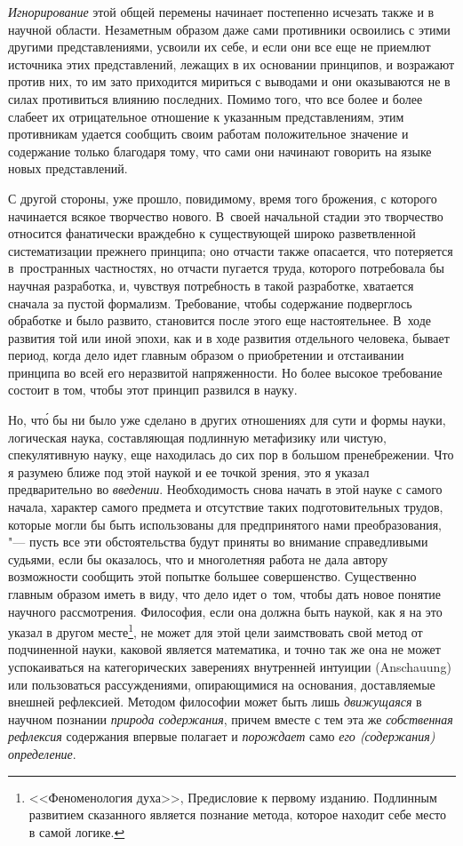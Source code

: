 {\em Игнорирование} этой общей перемены начинает постепенно исчезать также и в
научной области. Незаметным образом даже сами противники освоились с этими
другими представлениями, усвоили их себе, и если они все еще не приемлют
источника этих представлений, лежащих в их основании принципов, и возражают
против них, то им зато приходится мириться с выводами и они оказываются не в
силах противиться влиянию последних. Помимо того, что все более и более слабеет
их отрицательное отношение к указанным представлениям, этим противникам удается
сообщить своим работам положительное значение и содержание только благодаря
тому, что сами они начинают говорить на языке новых представлений.

С другой стороны, уже прошло, повидимому, время того брожения, с которого
начинается всякое творчество нового. В~своей начальной стадии это творчество
относится фанатически враждебно к существующей широко разветвленной
систематизации прежнего принципа; оно отчасти также опасается, что потеряется
в~пространных частностях, но отчасти пугается труда, которого потребовала бы
научная разработка, и, чувствуя потребность в такой разработке, хватается
сначала за пустой формализм. Требование, чтобы содержание подверглось обработке
и было развито, становится после этого еще настоятельнее. В~ходе развития той
или иной эпохи, как и в ходе развития отдельного человека, бывает период, когда
дело идет главным образом о приобретении и отстаивании принципа во всей его
неразвитой напряженности. Но более высокое требование состоит в том, чтобы этот
принцип развился в науку.

Но, чт\'{о} бы ни было уже сделано в других отношениях для сути и формы науки,
логическая наука, составляющая подлинную метафизику или чистую, спекулятивную
науку, еще находилась до сих пор в большом пренебрежении. Что я разумею ближе
под этой наукой и ее точкой зрения, это я указал предварительно во
{\em введении}. Необходимость снова начать в этой науке с самого начала,
характер самого предмета и отсутствие таких подготовительных трудов, которые
могли бы быть использованы для предпринятого нами преобразования, "--- пусть
все эти обстоятельства будут приняты во внимание справедливыми судьями, если бы
оказалось, что и многолетняя работа не дала автору возможности сообщить этой
попытке большее совершенство. Существенно главным образом иметь в виду, что
дело идет о~том, чтобы дать новое понятие научного рассмотрения. Философия,
если она должна быть наукой, как я на это указал в другом
месте\footnote{<<Феноменология духа>>, Предисловие к первому изданию. Подлинным
развитием сказанного является познание метода, которое находит себе место в
самой логике.}, не может для этой цели
заимствовать свой метод от подчиненной науки, каковой является математика, и
точно так же она не может успокаиваться на категорических заверениях внутренней
интуиции (Anschauung) или пользоваться рассуждениями, опирающимися на
основания, доставляемые внешней рефлексией. Методом философии может быть лишь
{\em движущаяся} в научном познании {\em природа содержания}, причем вместе с
тем эта же {\em собственная рефлексия} содержания впервые полагает и
{\em порождает} само {\em его (содержания) определение}.

